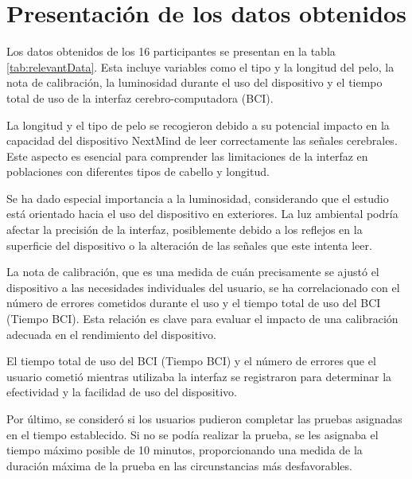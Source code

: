 \section{Presentación de los datos obtenidos}
Los datos obtenidos de los 16 participantes se presentan en la tabla \ref{tab:relevantData}. Esta incluye variables como el tipo y la longitud del pelo, la nota de calibración, la luminosidad durante el uso del dispositivo y el tiempo total de uso de la interfaz cerebro-computadora (BCI).



La longitud y el tipo de pelo se recogieron debido a su potencial impacto en la capacidad del dispositivo NextMind de leer correctamente las señales cerebrales. Este aspecto es esencial para comprender las limitaciones de la interfaz en poblaciones con diferentes tipos de cabello y longitud.



Se ha dado especial importancia a la luminosidad, considerando que el estudio está orientado hacia el uso del dispositivo en exteriores. La luz ambiental podría afectar la precisión de la interfaz, posiblemente debido a los reflejos en la superficie del dispositivo o la alteración de las señales que este intenta leer.



La nota de calibración, que es una medida de cuán precisamente se ajustó el dispositivo a las necesidades individuales del usuario, se ha correlacionado con el número de errores cometidos durante el uso y el tiempo total de uso del BCI (Tiempo BCI). Esta relación es clave para evaluar el impacto de una calibración adecuada en el rendimiento del dispositivo.



El tiempo total de uso del BCI (Tiempo BCI) y el número de errores que el usuario cometió mientras utilizaba la interfaz se registraron para determinar la efectividad y la facilidad de uso del dispositivo.



Por último, se consideró si los usuarios pudieron completar las pruebas asignadas en el tiempo establecido. Si no se podía realizar la prueba, se les asignaba el tiempo máximo posible de 10 minutos, proporcionando una medida de la duración máxima de la prueba en las circunstancias más desfavorables.



